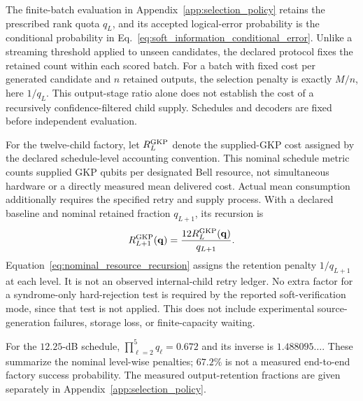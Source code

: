 \documentclass[aps,
prx,
superscriptaddress,
reprint,
longbibliography,
floatfix]{revtex4-2}
\begin{document}
The finite-batch evaluation in Appendix~\ref{app:selection_policy} retains the prescribed rank quota $q_L$, and its accepted logical-error probability is the conditional probability in Eq.~\eqref{eq:soft_information_conditional_error}. Unlike a streaming threshold applied to unseen candidates, the declared protocol fixes the retained count within each scored batch. For a batch with fixed cost per generated candidate and $n$ retained outputs, the selection penalty is exactly $M/n$, here $1/q_L$. This output-stage ratio alone does not establish the cost of a recursively confidence-filtered child supply. Schedules and decoders are fixed before independent evaluation.

For the twelve-child factory, let $R_L^{\rm GKP}$ denote the supplied-GKP cost assigned by the declared schedule-level accounting convention. This nominal schedule metric counts supplied GKP qubits per designated Bell resource, not simultaneous hardware or a directly measured mean delivered cost. Actual mean consumption additionally requires the specified retry and supply process. With a declared baseline and nominal retained fraction $q_{L+1}$, its recursion is
\begin{equation}
R_{L+1}^{\rm GKP}(\mathbf q)
=\frac{12R_L^{\rm GKP}(\mathbf q)}{q_{L+1}}.
\label{eq:nominal_resource_recursion}
\end{equation}
Equation~\eqref{eq:nominal_resource_recursion} assigns the retention penalty $1/q_{L+1}$ at each level. It is not an observed internal-child retry ledger. No extra factor for a syndrome-only hard-rejection test is required by the reported soft-verification mode, since that test is not applied. This does not include experimental source-generation failures, storage loss, or finite-capacity waiting.

For the $12.25$-dB schedule, $\prod_{\ell=2}^{5}q_\ell=0.672$ and its inverse is $1.488095\ldots$. These summarize the nominal level-wise penalties; $67.2\%$ is not a measured end-to-end factory success probability. The measured output-retention fractions are given separately in Appendix~\ref{app:selection_policy}.
\end{document}
